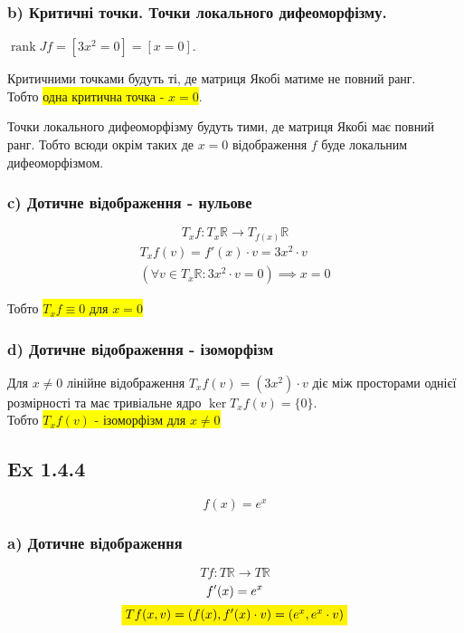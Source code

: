 \documentclass[10pt, a4paper]{article} %
\newcommand{\R}{\mathbb{R}}
\DeclareMathOperator{\rank}{rank}
\newcommand{\todo}[1]{\colorbox{red}{\textbf{TODO}: #1}}
\begin{document}
\subsubsection*{b) Критичні точки. Точки локального дифеоморфізму.}
$\rank Jf = [3x^2 = 0] = [x = 0]$.

Критичними точками будуть ті, де матриця Якобі матиме не повний ранг.\\
Тобто \colorbox{yellow}{одна критична точка - $x = 0$}.

Точки локального дифеоморфізму будуть тими, де матриця Якобі має повний ранг.
Тобто всюди окрім таких де $x = 0$ відображення $f$ буде локальним дифеоморфізмом.

\subsubsection*{c) Дотичне відображення - нульове}
\[T_{x}f : T_{x}\R \to T_{f(x)}\R\]
\begin{gather*}
    T_{x}f(v) = f'(x) \cdot v = 3x^2 \cdot v\\
    \left(\forall v\in T_{x}\R: 3x^2 \cdot v = 0\right) \implies  x=0
\end{gather*}

Тобто \colorbox{yellow}{$T_{x}f \equiv 0$ для $x=0$}

\subsubsection*{d) Дотичне відображення - ізоморфізм}

Для $x \ne 0$ лінійне відображення $T_{x}f(v) = (3x^2) \cdot v$ діє між просторами однієї розмірності та має тривіальне ядро $\ker T_{x}f(v) = \{0\}$. \\
Тобто \colorbox{yellow}{$T_{x}f(v)$ - ізоморфізм для $x\ne 0$}



\subsection*{Ex 1.4.4}
\begin{mdframed}
    \[f(x) = e^x\]
\end{mdframed}

\subsubsection*{a) Дотичне відображення}
\[Tf : T\R \to T\R\]
\begin{gather*}
    f'(x) = e^x\\
    \colorbox{yellow}{$Tf(x,v) = (f(x), f'(x)\cdot v) = (e^x, e^x \cdot v)$}
\end{gather*}
\end{document}
